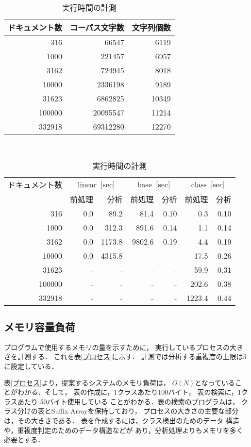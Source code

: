 \begin{table}[htbp]
\begin {center}
\begin{tabular}{|r|r|r|}
\hline
ドキュメント数&コーパス文字数&文字列個数\\ \hline
	316&   66547&	 6119\\
	1000&  221457&	 6957\\
	3162&  724945&	 8018\\
	10000& 2336198&  9189\\
	31623& 6862825& 10349\\
	100000&20095547&11214\\
	332918&69312280&12270\\ \hline 
\end{tabular}
\vspace*{3mm}
\\
\begin{tabular}{|r|rr|rr|rr|}
\hline
{ドキュメント数}&
\multicolumn{2}{|c|}{linear\ [sec]}&
\multicolumn{2}{|c|}{base\ [sec]}&
\multicolumn{2}{|c|}{class\ [sec]}\\
&前処理&分析&前処理&分析&前処理&分析\\ \hline
316&  0.0&  89.2&  81.4&0.10&  0.3 &0.10\\ 
1000& 0.0& 312.3& 891.6&0.14&  1.1 &0.14\\ 
3162& 0.0&1173.8&9802.6&0.19&  4.4 &0.19\\ 
10000&0.0&4315.8&    - &  - & 17.5 &0.26\\
31623& - &    - &    - &  - & 59.9 &0.31\\
100000&- &    - &    - &  - &202.6 &0.38\\
332918&- &    - &    - &  - &1223.4&0.44\\ \hline
\end{tabular}
\vspace*{2mm}
\caption{実行時間の計測}
\label{実行時間}
\end{center}
\end{table}

\vspace*{4em}
\subsection{メモリ容量負荷}

プログラムで使用するメモリの量を示すために，
実行しているプロセスの大きさを計測する．
これを表\ref{プロセス}に示す．
計測では分析する重複度の上限は5に設定している．

表\ref{プロセス}より，提案するシステムのメモリ負荷は，
$O(N)$となっていることがわかる．そして，
表の作成に，1クラスあたり100バイト，
表の検索に，1クラスあたり 50バイト使用している
ことがわかる．表の検索のプログラムは，
クラス分けの表とSuffix Arrayを保持しており，
プロセスの大きさの主要な部分は，その大きさである．
表を作成するには，クラス検出のためのデータ
構造や，重複度判定のためのデータ構造などが
あり，分析処理よりもメモリを多く必要とする．

